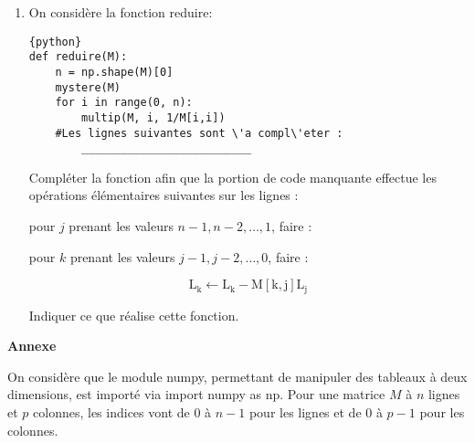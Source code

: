 \begin{exercice} 
\begin{enumerate}
\begin{enumerate}
\item On considère dans cette question l'algorithme mystere appliqué à la matrice \[M_{1}=\left(\begin{array}{ccc}3 & 2 & 2 \\ -6 & 0 & 12 \\ 1 & 1 & -3\end{array}\right)\] Indiquer combien de fois la ligne print (M) est exécutée ainsi que les différentes valeurs qu'elle affiche
\item De façon générale, que réalise cet algorithme?
\end{enumerate} 
\item On considère la fonction reduire:
\begin{lstlisting}{python}
def reduire(M):
    n = np.shape(M)[0]
    mystere(M)
    for i in range(0, n):
        multip(M, i, 1/M[i,i])
    #Les lignes suivantes sont \'a compl\'eter :
        __________________________        
\end{lstlisting}
Compléter la fonction afin que la portion de code manquante effectue les opérations élémentaires suivantes sur les lignes :

pour $j$ prenant les valeurs $n-1, n-2, \ldots, 1$, faire :


\hspace{2cm}	pour $k$ prenant les valeurs $j-1, j-2, \ldots, 0$, faire :

$$
\mathrm{L}_{\mathrm{k}} \leftarrow \mathrm{L}_{\mathrm{k}}-\mathrm{M}[\mathrm{k}, \mathrm{j}] \mathrm{L}_{\mathrm{j}}
$$



Indiquer ce que réalise cette fonction.
\end{enumerate}

\begin{center}
\textbf{\huge{Annexe}}
\end{center}
On considère que le module numpy, permettant de manipuler des tableaux à deux dimensions, est importé via import numpy as np. Pour une matrice $M$ à $n$ lignes et $p$ colonnes, les indices vont de 0 à $n-1$ pour les lignes et de 0 à $p-1$ pour les colonnes.


\end{exercice}
